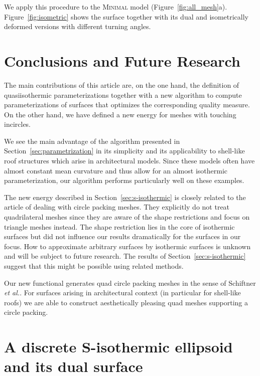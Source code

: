 \documentclass[Thesis.tex]{subfiles}
\begin{document}
We apply this procedure to the \textsc{Minimal} model
\mbox{(Figure~\ref{fig:all_mesh}a)}. Figure~\ref{fig:isometric} shows the
surface together
with its dual and isometrically deformed versions with different turning angles.


\section{Conclusions and Future Research}
\label{sec:future}
The main contributions of this article are, on the one hand, the definition of 
quasiisothermic parameterizations together with a new algorithm to
compute parameterizations of surfaces that optimizes the corresponding quality measure.
On the other hand, we have defined a new energy for meshes with touching incircles.

We see the main advantage of the algorithm presented in
Section~\ref{sec:parametrization} in its simplicity and its applicability to
shell-like roof structures which arise in architectural models. Since these
models often have almost constant mean curvature and thus allow for an almost
isothermic parameterization, our algorithm performs particularly well on these
examples.

The new energy described in Section~\ref{sec:s-isothermic} is closely related
to the article of \cite{SchiftnerHWP2009} dealing with
circle packing meshes. They explicitly do not treat quadrilateral meshes since
they are aware of the shape restrictions and focus on triangle meshes instead.
The shape restriction lies in the core of isothermic surfaces but
did not influence our results dramatically for the surfaces in our focus. How
to approximate arbitrary surfaces by isothermic surfaces is unknown and will be
subject to future research. The results of Section~\ref{sec:s-isothermic}
suggest that this might be possible using related methods.

Our new functional generates quad circle packing meshes in the sense of
Schiftner \emph{et al.}. For surfaces arising in architectural context (in
particular for shell-like roofs) we are able to construct aesthetically
pleasing quad meshes supporting a circle packing. 

\section{A discrete S-isothermic ellipsoid and its dual surface}
\end{document}
